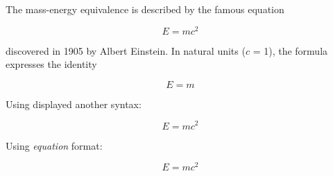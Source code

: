 \documentclass{article}
\begin{document}
The mass-energy equivalence is described by the famous equation

$$E=mc^2$$

discovered in 1905 by Albert Einstein. In natural units ($c$ = 1), the formula expresses the identity

\begin{equation}
E=m
\end{equation}

Using displayed another syntax:

\begin{displaymath}
E=mc^2
\end{displaymath}

Using \textit{equation} format:

\begin{equation}
E=mc^2
\end{equation}
\end{document}
